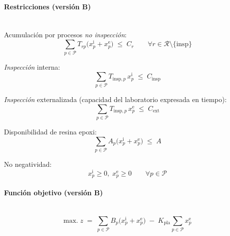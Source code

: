 \paragraph{Restricciones (versión B)}\mbox{}\\
Acumulación por procesos \emph{no inspección}:
\begin{equation}
    \sum_{p \in \mathcal{P}} T_{rp}\big(x_p^{\mathrm{i}} + x_p^{\mathrm{e}}\big) \;\le\; C_r
    \qquad \forall r \in \mathcal{R}\setminus\{\mathrm{insp}\}
\end{equation}

\emph{Inspección} interna:
\begin{equation}
    \sum_{p \in \mathcal{P}} T_{\mathrm{insp},p}\,x_p^{\mathrm{i}} \;\le\; C_{\mathrm{insp}}
\end{equation}

\emph{Inspección} externalizada (capacidad del laboratorio expresada en tiempo):
\begin{equation}
    \sum_{p \in \mathcal{P}} T_{\mathrm{insp},p}\,x_p^{\mathrm{e}} \;\le\; C_{\mathrm{ext}}
\end{equation}

Disponibilidad de resina epoxi:
\begin{equation}
    \sum_{p \in \mathcal{P}} A_p\big(x_p^{\mathrm{i}} + x_p^{\mathrm{e}}\big) \;\le\; A
\end{equation}

No negatividad:
\begin{equation}
    x_p^{\mathrm{i}} \ge 0,\; x_p^{\mathrm{e}} \ge 0 \qquad \forall p \in \mathcal{P}
\end{equation}

\paragraph{Función objetivo (versión B)}\mbox{}\\
\begin{equation}
\mbox{max.}\; z \;=\;
\sum_{p \in \mathcal{P}} B_p\big(x_p^{\mathrm{i}} + x_p^{\mathrm{e}}\big)
\;-\;
K_{\mathrm{pla}} \sum_{p \in \mathcal{P}} x_p^{\mathrm{e}}
\end{equation}


